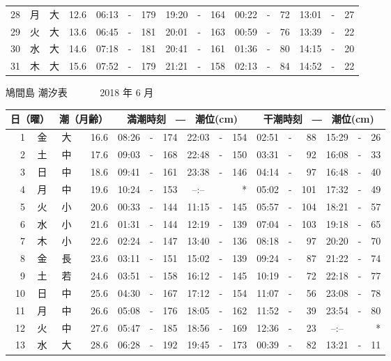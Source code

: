 \documentclass[12pt.a4j]{jsarticle}
\begin{document}
\begin{center}
\begin{table}[ht]
\begin{tabular}{|rc|cr|ccrccr|ccrccr|}
28 & 月 & 大 & 12.6 & 06:13 &-& 179 & 19:20 &-& 164 & 00:22 &-&  72 & 13:01 &-&  27 \\
29 & 火 & 大 & 13.6 & 06:45 &-& 181 & 20:01 &-& 163 & 00:59 &-&  76 & 13:39 &-&  22 \\
30 & 水 & 大 & 14.6 & 07:18 &-& 181 & 20:41 &-& 161 & 01:36 &-&  80 & 14:15 &-&  20 \\
31 & 木 & 大 & 15.6 & 07:52 &-& 179 & 21:21 &-& 158 & 02:13 &-&  84 & 14:52 &-&  22 \\
\hline
\end{tabular}
\end{table}
\newpage
{\LARGE 鳩間島  潮汐表　　　}
{\large 2018 年  6 月}\\
\begin{table}[ht]
\begin{tabular}{|rc|cr|ccrccr|ccrccr|}
\hline
\multicolumn{2}{|c|}{日（曜）} & \multicolumn{2}{c|}{潮（月齢）} & \multicolumn{6}{c|}{満潮時刻　―　潮位(cm)} & \multicolumn{6}{c|}{干潮時刻　―　潮位(cm)} \\
\hline
 1 & 金 & 大 & 16.6 & 08:26 &-& 174 & 22:03 &-& 154 & 02:51 &-&  88 & 15:29 &-&  26 \\
 2 & 土 & 中 & 17.6 & 09:03 &-& 168 & 22:48 &-& 150 & 03:31 &-&  92 & 16:08 &-&  33 \\
 3 & 日 & 中 & 18.6 & 09:41 &-& 161 & 23:38 &-& 146 & 04:14 &-&  97 & 16:48 &-&  40 \\
 4 & 月 & 中 & 19.6 & 10:24 &-& 153 & --:-- & &  *  & 05:02 &-& 101 & 17:32 &-&  49 \\
 5 & 火 & 小 & 20.6 & 00:33 &-& 144 & 11:15 &-& 145 & 05:57 &-& 104 & 18:21 &-&  57 \\
 6 & 水 & 小 & 21.6 & 01:31 &-& 144 & 12:19 &-& 139 & 07:04 &-& 103 & 19:18 &-&  65 \\
 7 & 木 & 小 & 22.6 & 02:24 &-& 147 & 13:40 &-& 136 & 08:18 &-&  97 & 20:20 &-&  70 \\
 8 & 金 & 長 & 23.6 & 03:11 &-& 151 & 15:02 &-& 139 & 09:24 &-&  87 & 21:22 &-&  74 \\
 9 & 土 & 若 & 24.6 & 03:51 &-& 158 & 16:12 &-& 145 & 10:19 &-&  72 & 22:18 &-&  77 \\
10 & 日 & 中 & 25.6 & 04:30 &-& 167 & 17:12 &-& 154 & 11:07 &-&  56 & 23:08 &-&  78 \\
11 & 月 & 中 & 26.6 & 05:08 &-& 176 & 18:05 &-& 162 & 11:52 &-&  39 & 23:54 &-&  80 \\
12 & 火 & 中 & 27.6 & 05:47 &-& 185 & 18:56 &-& 169 & 12:36 &-&  23 & --:-- & &  *  \\
13 & 水 & 大 & 28.6 & 06:28 &-& 192 & 19:45 &-& 173 & 00:39 &-&  82 & 13:21 &-&  11 \\

\end{tabular}
\end{table}
\end{center}
\end{document}
